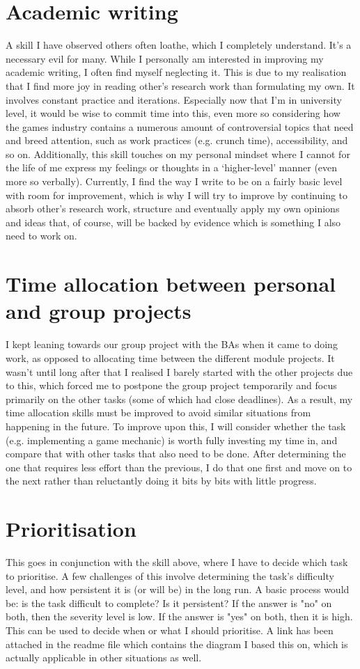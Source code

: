 \documentclass{scrartcl}
\begin{document}
\section{Academic writing}
A skill I have observed others often loathe, which I completely understand. It's a necessary evil for many. While I personally am interested in improving my academic writing, I often find myself neglecting it. This is due to my realisation that I find more joy in reading other's research work than formulating my own. It involves constant practice and iterations. Especially now that I'm in university level, it would be wise to commit time into this, even more so considering how the games industry contains a numerous amount of controversial topics that need and breed attention, such as work practices (e.g. crunch time), accessibility, and so on. Additionally, this skill touches on my personal mindset where I cannot for the life of me express my feelings or thoughts in a `higher-level' manner (even more so verbally). Currently, I find the way I write to be on a fairly basic level with room for improvement, which is why I will try to improve by continuing to absorb other's research work, structure and eventually apply my own opinions and ideas that, of course, will be backed by evidence which is something I also need to work on. 

\section{Time allocation between personal and group projects}
I kept leaning towards our group project with the BAs when it came to doing work, as opposed to allocating time between the different module projects. It wasn't until long after that I realised I barely started with the other projects due to this, which forced me to postpone the group project temporarily and focus primarily on the other tasks (some of which had close deadlines). As a result, my time allocation skills must be improved to avoid similar situations from happening in the future. To improve upon this, I will consider whether the task (e.g. implementing a game mechanic) is worth fully investing my time in, and compare that with other tasks that also need to be done. After determining the one that requires less effort than the previous, I do that one first and move on to the next rather than reluctantly doing it bits by bits with little progress.  

\section{Prioritisation}
This goes in conjunction with the skill above, where I have to decide which task to prioritise. A few challenges of this involve determining the task's difficulty level, and how persistent it is (or will be) in the long run. A basic process would be: is the task difficult to complete? Is it persistent? If the answer is "no" on both, then the severity level is low. If the answer is "yes" on both, then it is high. This can be used to decide when or what I should prioritise. A link has been attached in the readme file which contains the diagram I based this on, which is actually applicable in other situations as well. 
\end{document}

